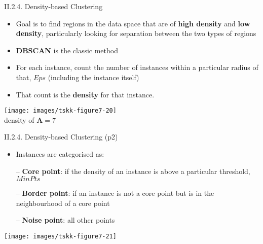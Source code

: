 \documentclass[handout]{beamer}
\newcommand{\strong}[1]{\textbf{\color{teal} #1}}
\newcommand{\stronger}[1]{\textbf{\color{purple} #1}}
\begin{document}
\begin{frame}{II.2.4. Density-based Clustering}
\begin{itemize}
\item Goal is to find regions in the data space that are of \strong{high density} and \strong{low density}, particularly looking for separation between the two types of regions
\item \stronger{DBSCAN} is the classic method
\item For each instance, count the number of instances within a particular radius of that, $Eps$ (including the instance itself)
\item That count is the \strong{density} for that instance.
\end{itemize}
\begin{center}
\texttt{[image: images/tskk-figure7-20]}\\
density of \textbf{A}$=7$\\
\cite[Figure 7.20]{tan-et-al:2018}
\end{center}
\end{frame}
\begin{frame}{II.2.4. Density-based Clustering (p2)}
\begin{itemize}
\item Instances are categorised as:
\item[--] \strong{Core point}: if the density of an instance is above a particular threshold, $MinPts$
\item[--] \strong{Border point}: if an instance is not a core point but is in the neighbourhood of a core point
\item[--] \strong{Noise point}: all other points
\end{itemize}
\begin{center}
\texttt{[image: images/tskk-figure7-21]}\\
\cite[Figure 7.21]{tan-et-al:2018}
\end{center}
\end{frame}
\end{document}
